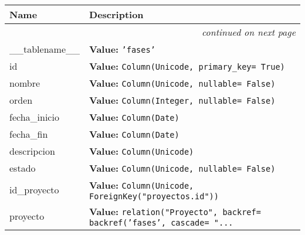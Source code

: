    \vspace{-1cm}
\hspace{\varindent}\begin{longtable}{|p{\varnamewidth}|p{\vardescrwidth}|l}
\cline{1-2}
\cline{1-2} \centering \textbf{Name} & \centering \textbf{Description}& \\
\cline{1-2}
\endhead\cline{1-2}\multicolumn{3}{r}{\small\textit{continued on next page}}\\\endfoot\cline{1-2}
\endlastfoot\raggedright \_\-\_\-t\-a\-b\-l\-e\-n\-a\-m\-e\-\_\-\_\- & \raggedright \textbf{Value:} 
{\tt 'fases'}&\\
\cline{1-2}
\raggedright i\-d\- & \raggedright \textbf{Value:} 
{\tt Column(Unicode, primary\_key= True)}&\\
\cline{1-2}
\raggedright n\-o\-m\-b\-r\-e\- & \raggedright \textbf{Value:} 
{\tt Column(Unicode, nullable= False)}&\\
\cline{1-2}
\raggedright o\-r\-d\-e\-n\- & \raggedright \textbf{Value:} 
{\tt Column(Integer, nullable= False)}&\\
\cline{1-2}
\raggedright f\-e\-c\-h\-a\-\_\-i\-n\-i\-c\-i\-o\- & \raggedright \textbf{Value:} 
{\tt Column(Date)}&\\
\cline{1-2}
\raggedright f\-e\-c\-h\-a\-\_\-f\-i\-n\- & \raggedright \textbf{Value:} 
{\tt Column(Date)}&\\
\cline{1-2}
\raggedright d\-e\-s\-c\-r\-i\-p\-c\-i\-o\-n\- & \raggedright \textbf{Value:} 
{\tt Column(Unicode)}&\\
\cline{1-2}
\raggedright e\-s\-t\-a\-d\-o\- & \raggedright \textbf{Value:} 
{\tt Column(Unicode, nullable= False)}&\\
\cline{1-2}
\raggedright i\-d\-\_\-p\-r\-o\-y\-e\-c\-t\-o\- & \raggedright \textbf{Value:} 
{\tt Column(Unicode, ForeignKey("proyectos.id"))}&\\
\cline{1-2}
\raggedright p\-r\-o\-y\-e\-c\-t\-o\- & \raggedright \textbf{Value:} 
{\tt relation("Proyecto", backref= backref('fases', cascade= "\texttt{...}}&\\
\cline{1-2}
\end{longtable}



